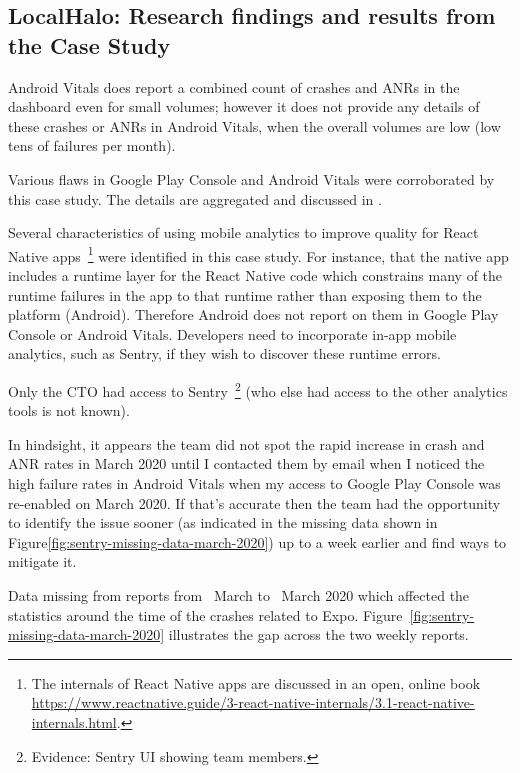 \subsection{LocalHalo: Research findings and results from the Case Study}

Android Vitals does report a combined count of crashes and ANRs in the dashboard even for small volumes; however it does not provide any details of these crashes or ANRs in Android Vitals, when the overall volumes are low (low tens of failures per month).

Various flaws in Google Play Console and Android Vitals were corroborated by this case study. The details are aggregated and discussed in .

Several characteristics of using mobile analytics to improve quality for React Native apps~\footnote{The internals of React Native apps are discussed in an open, online book \url{https://www.reactnative.guide/3-react-native-internals/3.1-react-native-internals.html}.} 
were identified in this case study. For instance, that the native app includes a runtime layer for the React Native code which constrains many of the runtime failures in the app to that runtime rather than exposing them to the platform (Android). Therefore Android does not report on them in Google Play Console or Android Vitals. Developers need to incorporate in-app mobile analytics, such as Sentry, if they wish to discover these runtime errors.

Only the CTO had access to Sentry~\footnote{Evidence: Sentry UI showing team members.} (who else had access to the other analytics tools is not known).

In hindsight, it appears the team did not spot the rapid increase in crash and ANR rates in March 2020 until I contacted them by email when I noticed the high failure rates in Android Vitals when my access to Google Play Console was re-enabled on  March 2020. If that's accurate then the team had the opportunity to identify the issue sooner (as indicated in the missing data shown in Figure\ref{fig:sentry-missing-data-march-2020}) up to a week earlier and find ways to mitigate it. 

Data missing from reports from~ March to~ March 2020 which affected the statistics around the time of the crashes related to Expo. Figure~\ref{fig:sentry-missing-data-march-2020} illustrates the gap across the two weekly reports. 


